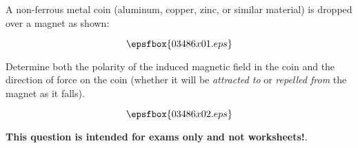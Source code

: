 

A non-ferrous metal coin (aluminum, copper, zinc, or similar material) is dropped over a magnet as shown:

$$\epsfbox{03486x01.eps}$$

Determine both the polarity of the induced magnetic field in the coin and the direction of force on the coin (whether it will be {\it attracted to} or {\it repelled from} the magnet as it falls).







$$\epsfbox{03486x02.eps}$$







{\bf This question is intended for exams only and not worksheets!}.




